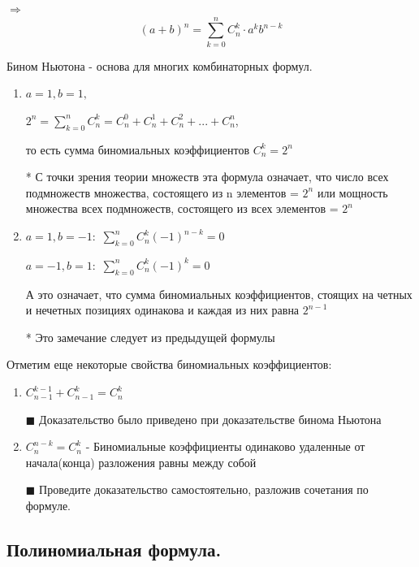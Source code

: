 \documentclass[12pt, a4paper, oneside]{article}
\theoremstyle{plain} %
\theoremstyle{definition}
\begin{document}
{$\Longrightarrow$}
\[(a+b)^n =\sum\limits_{k=0}^n  C_{n}^{k} \cdot a^k b^{n-k}
\]




Бином Ньютона - основа для многих комбинаторных формул.

\begin{enumerate}

    \item $a = 1, b = 1,$
    
    $2^n=\sum\limits_{k=0}^n C_{n}^{k} = C_{n}^{0} +C_{n}^{1} + C_{n}^{2} + ... + C_{n}^{n}$,
    
    то есть сумма биномиальных коэффициентов $C_{n}^{k} = 2^n$
    
    * С точки зрения теории множеств эта формула означает, что число всех подмножеств множества, состоящего из n элементов = $2^n$ или мощность множества всех подмножеств, состоящего из всех элементов = $2^n$
    
    
    \item  $a = 1, b = -1:$ $\sum\limits_{k=0}^n C_{n}^{k} (-1)^{n-k} = 0$
    
    $a = -1, b = 1:$
    $\sum\limits_{k=0}^n C_{n}^{k} (-1)^{k} = 0$
    
    А это означает, что сумма биномиальных коэффициентов, стоящих на четных и нечетных позициях одинакова и каждая из них равна $2^{n-1}$
    
    * Это замечание следует из предыдущей  формулы
    
\end{enumerate}

Отметим еще некоторые свойства биномиальных коэффициентов:

\begin{enumerate}

\item $C_{n-1}^{k-1} + C_{n-1}^{k} = C_{n}^{k} $

\(\blacksquare\) Доказательство было приведено при доказательстве бинома Ньютона%

\item $C_{n}^{n-k} = C_{n}^{k}$ - Биномиальные коэффициенты одинаково удаленные от начала(конца) разложения равны между собой

\(\blacksquare\) Проведите доказательство самостоятельно, разложив сочетания по формуле.

\end{enumerate}

\subsection{Полиномиальная формула.}
\end{document}
